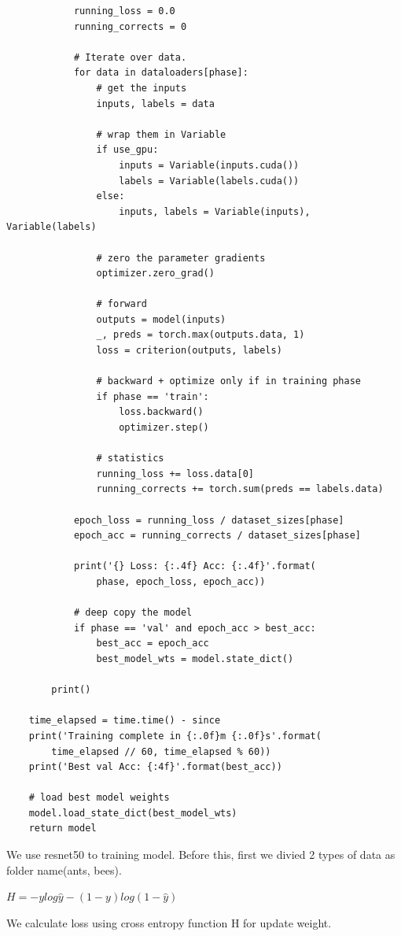 \documentclass{article}
\begin{document}
\begin{CJK}{UTF8}{}
\begin{verbatim}
            running_loss = 0.0
            running_corrects = 0

            # Iterate over data.
            for data in dataloaders[phase]:
                # get the inputs
                inputs, labels = data

                # wrap them in Variable
                if use_gpu:
                    inputs = Variable(inputs.cuda())
                    labels = Variable(labels.cuda())
                else:
                    inputs, labels = Variable(inputs), Variable(labels)

                # zero the parameter gradients
                optimizer.zero_grad()

                # forward
                outputs = model(inputs)
                _, preds = torch.max(outputs.data, 1)
                loss = criterion(outputs, labels)

                # backward + optimize only if in training phase
                if phase == 'train':
                    loss.backward()
                    optimizer.step()

                # statistics
                running_loss += loss.data[0]
                running_corrects += torch.sum(preds == labels.data)

            epoch_loss = running_loss / dataset_sizes[phase]
            epoch_acc = running_corrects / dataset_sizes[phase]

            print('{} Loss: {:.4f} Acc: {:.4f}'.format(
                phase, epoch_loss, epoch_acc))

            # deep copy the model
            if phase == 'val' and epoch_acc > best_acc:
                best_acc = epoch_acc
                best_model_wts = model.state_dict()

        print()

    time_elapsed = time.time() - since
    print('Training complete in {:.0f}m {:.0f}s'.format(
        time_elapsed // 60, time_elapsed % 60))
    print('Best val Acc: {:4f}'.format(best_acc))

    # load best model weights
    model.load_state_dict(best_model_wts)
    return model
\end{verbatim}

\newline We use resnet50 to training model. Before this, first we divied 2 types of data as folder name(ants, bees).\newline
\begin{center}$ H = -y log \hat{y} -(1-y)log(1-\hat{y})$\end{center}\newline
We calculate loss using cross entropy function H for update weight.\newline



\end{CJK}
\end{document}
